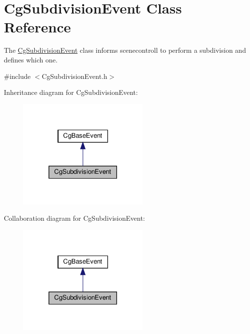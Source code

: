 \hypertarget{class_cg_subdivision_event}{}\section{Cg\+Subdivision\+Event Class Reference}
\label{class_cg_subdivision_event}


The \hyperlink{class_cg_subdivision_event}{Cg\+Subdivision\+Event} class informs scenecontroll to perform a subdivision and defines which one.  




{\ttfamily \#include $<$Cg\+Subdivision\+Event.\+h$>$}



Inheritance diagram for Cg\+Subdivision\+Event\+:
\nopagebreak
\begin{figure}[H]
\begin{center}
\leavevmode
\includegraphics[width=185pt]{class_cg_subdivision_event__inherit__graph}
\end{center}
\end{figure}


Collaboration diagram for Cg\+Subdivision\+Event\+:
\nopagebreak
\begin{figure}[H]
\begin{center}
\leavevmode
\includegraphics[width=185pt]{class_cg_subdivision_event__coll__graph}
\end{center}
\end{figure}
